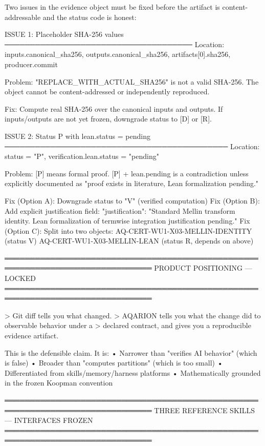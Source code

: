 Two issues in the evidence object must be fixed before the artifact is
content-addressable and the status code is honest:

ISSUE 1: Placeholder SHA-256 values
─────────────────────────────────────
  Location: inputs.canonical_sha256, outputs.canonical_sha256, 
           artifacts[0].sha256, producer.commit

  Problem: "REPLACE_WITH_ACTUAL_SHA256" is not a valid SHA-256.
  The object cannot be content-addressed or independently reproduced.

  Fix: Compute real SHA-256 over the canonical inputs and outputs.
       If inputs/outputs are not yet frozen, downgrade status to [D] or [R].

ISSUE 2: Status P with lean.status = pending
────────────────────────────────────────────
  Location: status = "P", verification.lean.status = "pending"

  Problem: [P] means formal proof. [P] + lean.pending is a contradiction
  unless explicitly documented as "proof exists in literature, Lean
  formalization pending."

  Fix (Option A): Downgrade status to "V" (verified computation)
  Fix (Option B): Add explicit justification field:
    "justification": "Standard Mellin transform identity. Lean formalization
                      of termwise integration justification pending."
  Fix (Option C): Split into two objects:
    AQ-CERT-WU1-X03-MELLIN-IDENTITY (status V)
    AQ-CERT-WU1-X03-MELLIN-LEAN (status R, depends on above)

═══════════════════════════════════════════════════════════════════════════════
PRODUCT POSITIONING — LOCKED
═══════════════════════════════════════════════════════════════════════════════

> Git diff tells you what changed.
> AQARION tells you what the change did to observable behavior under a
> declared contract, and gives you a reproducible evidence artifact.

This is the defensible claim. It is:
  • Narrower than "verifies AI behavior" (which is false)
  • Broader than "computes partitions" (which is too small)
  • Differentiated from skills/memory/harness platforms
  • Mathematically grounded in the frozen Koopman convention

═══════════════════════════════════════════════════════════════════════════════
THREE REFERENCE SKILLS — INTERFACES FROZEN
═══════════════════════════════════════════════════════════════════════════════

